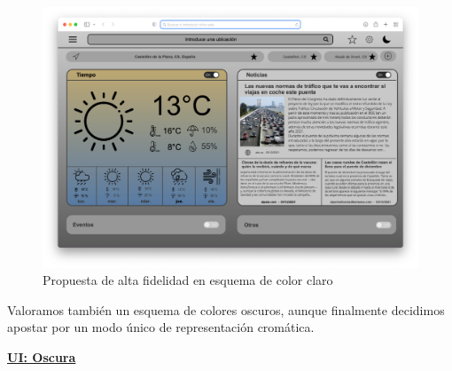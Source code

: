 \documentclass[../ei103948-project-documentation.tex]{subfiles}
\begin{document}
                                \begin{figure}[H]
                                    \begin{center}
                                        \hspace*{-7mm}
                                    \includegraphics[scale=0.861]{images/Boceto2.png}
                                    \end{center}
                                    \caption{Propuesta de alta fidelidad en esquema de color claro}
                                \end{figure}

                                Valoramos también un esquema de colores oscuros, aunque finalmente decidimos apostar por un modo único de representación cromática.

                                \newpage

                                \begin{center}
                                    \underline{\textbf{UI: Oscura}}
                                \end{center}
\end{document}
